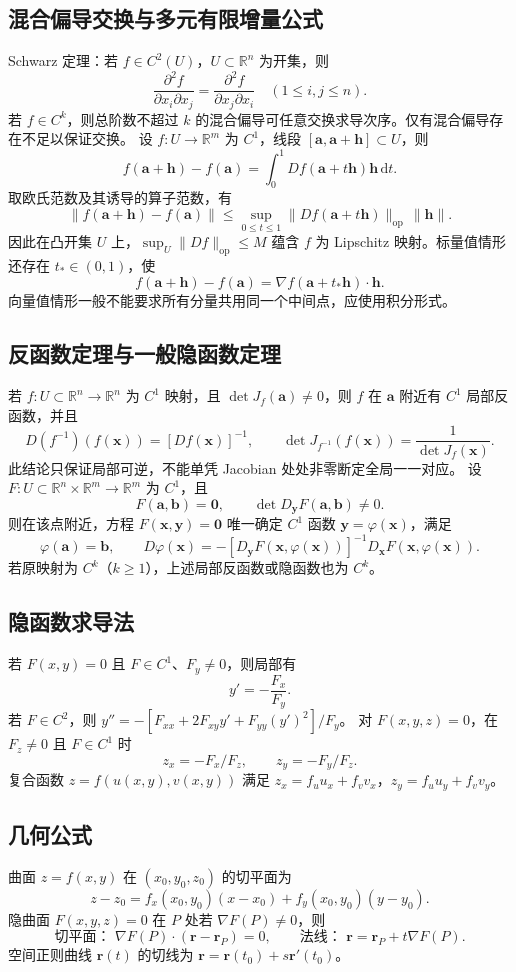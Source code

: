 \documentclass[../main.tex]{subfiles}
\begin{document}
\subsection{混合偏导交换与多元有限增量公式}
Schwarz 定理：若 $f\in C^2(U)$，$U\subset\mathbb R^n$ 为开集，则
\[
\frac{\partial^2f}{\partial x_i\partial x_j}
=\frac{\partial^2f}{\partial x_j\partial x_i}\quad(1\le i,j\le n).
\]
若 $f\in C^k$，则总阶数不超过 $k$ 的混合偏导可任意交换求导次序。仅有混合偏导存在不足以保证交换。
设 $f:U\to\mathbb R^m$ 为 $C^1$，线段 $[\bm a,\bm a+\bm h]\subset U$，则
\[
f(\bm a+\bm h)-f(\bm a)
=\int_0^1Df(\bm a+t\bm h)\bm h\,\mathrm dt.
\]
取欧氏范数及其诱导的算子范数，有
\[
\|f(\bm a+\bm h)-f(\bm a)\|
\le\sup_{0\le t\le1}\|Df(\bm a+t\bm h)\|_{\mathrm{op}}\,\|\bm h\|.
\]
因此在凸开集 $U$ 上，$\sup_U\|Df\|_{\mathrm{op}}\le M$ 蕴含 $f$ 为 Lipschitz 映射。标量值情形还存在 $t_*\in(0,1)$，使
\[
f(\bm a+\bm h)-f(\bm a)=\nabla f(\bm a+t_*\bm h)\cdot\bm h.
\]
向量值情形一般不能要求所有分量共用同一个中间点，应使用积分形式。
\subsection{反函数定理与一般隐函数定理}
若 $f:U\subset\mathbb R^n\to\mathbb R^n$ 为 $C^1$ 映射，且 $\det J_f(\bm a)\ne0$，则 $f$ 在 $\bm a$ 附近有 $C^1$ 局部反函数，并且
\[
D(f^{-1})(f(\bm x))=[Df(\bm x)]^{-1},\qquad
\det J_{f^{-1}}(f(\bm x))=\frac1{\det J_f(\bm x)}.
\]
此结论只保证局部可逆，不能单凭 Jacobian 处处非零断定全局一一对应。
设 $F:U\subset\mathbb R^n\times\mathbb R^m\to\mathbb R^m$ 为 $C^1$，且
\[
F(\bm a,\bm b)=\bm0,\qquad \det D_{\bm y}F(\bm a,\bm b)\ne0.
\]
则在该点附近，方程 $F(\bm x,\bm y)=\bm0$ 唯一确定 $C^1$ 函数 $\bm y=\varphi(\bm x)$，满足
\[
\varphi(\bm a)=\bm b,\qquad
D\varphi(\bm x)=-[D_{\bm y}F(\bm x,\varphi(\bm x))]^{-1}
D_{\bm x}F(\bm x,\varphi(\bm x)).
\]
若原映射为 $C^k$（$k\ge1$），上述局部反函数或隐函数也为 $C^k$。
\subsection{隐函数求导法}
若 $F(x,y)=0$ 且 $F\in C^1$、$F_y\ne0$，则局部有
\[
y'=-\frac{F_x}{F_y}.
\]
若 $F\in C^2$，则 $y''=-[F_{xx}+2F_{xy}y'+F_{yy}(y')^2]/F_y$。
对 $F(x,y,z)=0$，在 $F_z\ne0$ 且 $F\in C^1$ 时
\[
z_x=-F_x/F_z,\qquad z_y=-F_y/F_z.
\]
复合函数 $z=f(u(x,y),v(x,y))$ 满足 $z_x=f_u u_x+f_v v_x$，$z_y=f_u u_y+f_v v_y$。
\subsection{几何公式}
曲面 $z=f(x,y)$ 在 $(x_0,y_0,z_0)$ 的切平面为
\[
z-z_0=f_x(x_0,y_0)(x-x_0)+f_y(x_0,y_0)(y-y_0).
\]
隐曲面 $F(x,y,z)=0$ 在 $P$ 处若 $\nabla F(P)\ne0$，则
\[
\text{切平面： }\nabla F(P)\cdot(\bm r-\bm r_P)=0,\qquad
\text{法线： }\bm r=\bm r_P+t\nabla F(P).
\]
空间正则曲线 $\bm r(t)$ 的切线为 $\bm r=\bm r(t_0)+s\bm r'(t_0)$。
\end{document}
